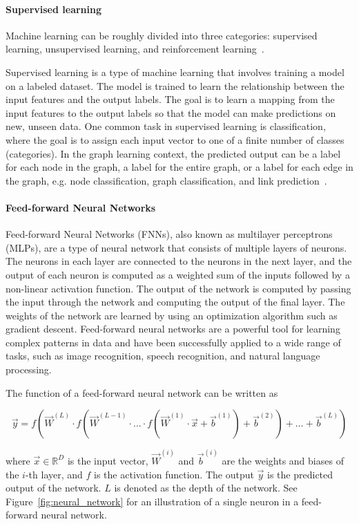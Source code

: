 \paragraph{Supervised learning}
Machine learning can be roughly divided into three categories: supervised learning, unsupervised learning, and reinforcement learning~\cite{bishop2006pattern}.

Supervised learning is a type of machine learning that involves training a model on a labeled dataset. The model is trained to learn the relationship between the input features and the output labels. The goal is to learn a mapping from the input features to the output labels so that the model can make predictions on new, unseen data. One common task in supervised learning is classification, where the goal is to assign each input vector to one of a finite number of classes (categories). In the graph learning context, the predicted output can be a label for each node in the graph, a label for the entire graph, or a label for each edge in the graph, e.g. node classification, graph classification, and link prediction~\cite{velivckovic2023everything}.

\paragraph{Feed-forward Neural Networks}

Feed-forward Neural Networks (FNNs), also known as multilayer perceptrons (MLPs), are a type of neural network that consists of multiple layers of neurons. The neurons in each layer are connected to the neurons in the next layer, and the output of each neuron is computed as a weighted sum of the inputs followed by a non-linear activation function. The output of the network is computed by passing the input through the network and computing the output of the final layer. The weights of the network are learned by using an optimization algorithm such as gradient descent. Feed-forward neural networks are a powerful tool for learning complex patterns in data and have been successfully applied to a wide range of tasks, such as image recognition, speech recognition, and natural language processing.

The function of a feed-forward neural network can be written as

$$ 
    \vec{y} = f(\vec{W}^{(L)} \cdot f(\vec{W}^{(L-1)} \cdot \ldots \cdot f(\vec{W}^{(1)} \cdot \vec{x} + \vec{b}^{(1)}) + \vec{b}^{(2)}) + \ldots + \vec{b}^{(L)})
$$

where $\vec{x}\in \mathbb{R}^D$ is the input vector, $\vec{W}^{(i)}$ and $\vec{b}^{(i)}$ are the weights and biases of the $i$-th layer, and $f$ is the activation function. The output $\vec{y}$ is the predicted output of the network. $L$ is denoted as the depth of the network. See Figure~\ref{fig:neural_network} for an illustration of a single neuron in a feed-forward neural network.

